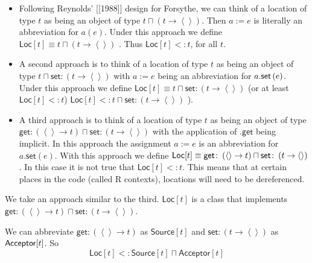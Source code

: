 \documentclass[12pt]{article}
\begin{document}
\begin{itemize}
\item Following Reynolds' [[1988]] design for Forsythe, we can think of a
location of type $t$ as being an object of type $t\sqcap \left( t\rightarrow
\left\langle {}\right\rangle \right) $. Then $a:=e$ is literally an
abbreviation for $a(e)$. Under this approach we define $\mathsf{Loc}%
[t]\equiv t\sqcap \left( t\rightarrow \left\langle {}\right\rangle \right) $%
. Thus $\mathsf{Loc}[t]<:t$, for all $t$.

\item A second approach is to think of a location of type $t$ as being an
object of type $t\sqcap \mathsf{set}\colon \left( t\rightarrow \left\langle
{}\right\rangle \right) $ with $a:=e$ being an abbreviation for $a.\mathsf{%
set}\left( e\right) $. Under this approach we define $\mathsf{Loc}[t]\equiv
t\sqcap \mathsf{set}\colon \left( t\rightarrow \left\langle {}\right\rangle
\right) $ (or at least $\mathsf{Loc}[t]<:t$) $\mathsf{Loc}[t]<:t\sqcap 
\mathsf{set}\colon \left( t\rightarrow \left\langle {}\right\rangle \right) $%
).

\item A third approach is to think of a location of type $t$ as being an
object of type $\mathsf{get}\colon \left( \left\langle {}\right\rangle
\rightarrow t\right) \sqcap \mathsf{set}\colon \left( t\rightarrow
\left\langle {}\right\rangle \right) $ with the application of $.\mathsf{get}
$ being implicit. In this approach the assignment $a:=e$ is an abbreviation
for $a.\mathsf{set}\left( e\right) $. With this approach we define $\mathsf{%
Loc}[t]\equiv \mathsf{get}\colon \left( \left\langle {}\right\rangle
\rightarrow t\right) \sqcap \mathsf{set}\colon \left( t\rightarrow
\left\langle {}\right\rangle \right) $. In this case it is not true that $%
\mathsf{Loc}[t]<:t$. This means that at certain places in the code (called R
contexts), locations will need to be dereferenced.
\end{itemize}

We take an approach similar to the third. $\mathsf{Loc}[t]$ is a class that
implements $\mathsf{get}\colon \left( \left\langle {}\right\rangle
\rightarrow t\right) \sqcap \mathsf{set}\colon \left( t\rightarrow
\left\langle {}\right\rangle \right) $.

We can abbreviate $\mathsf{get}\colon \left( \left\langle {}\right\rangle
\rightarrow t\right) $ as $\mathsf{Source}[t]$ and $\mathsf{set}\colon
\left( t\rightarrow \left\langle {}\right\rangle \right) $ as $\mathsf{%
Acceptor}[t]$. So%
\begin{equation*}
\mathsf{Loc}[t]<:\mathsf{Source}[t]\sqcap \mathsf{Acceptor}[t]
\end{equation*}
\end{document}
